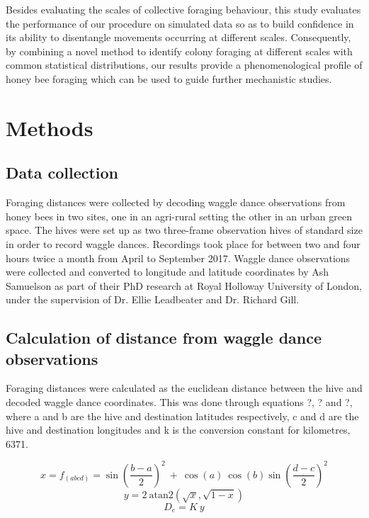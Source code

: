 \documentclass[11pt,usenames,dvipsnames,a4paper]{article}
\begin{document}
\begin{linenumbers}
Besides evaluating the scales of collective foraging behaviour, this study evaluates the performance of our procedure on simulated data so as to build confidence in its ability to disentangle movements occurring at different scales. Consequently, by combining a novel method to identify colony foraging at different scales with common statistical distributions, our results provide a phenomenological profile of honey bee foraging which can be used to guide further mechanistic studies.
\end{linenumbers}
	
\section{Methods}

\subsection{Data collection}

\begin{linenumbers}
\hspace{\parindent}
Foraging distances were collected by decoding waggle dance observations from honey bees in two sites, one in an agri-rural setting the other in an urban green space. The hives were set up as two three-frame observation hives of standard size in order to record waggle dances. Recordings took place for between two and four hours twice a month from April to September 2017. Waggle dance observations were collected and converted to longitude and latitude coordinates by Ash Samuelson as part of their PhD research at Royal Holloway University of London, under the supervision of Dr. Ellie Leadbeater and Dr. Richard Gill.
\end{linenumbers}

\subsection{Calculation of distance from waggle dance observations}

\begin{linenumbers}
\hspace{\parindent}
Foraging distances were calculated as the euclidean distance between the hive and decoded waggle dance coordinates. This was done through equations ?, ? and ?, where a and b are the hive and destination latitudes respectively, c and d are the hive and destination longitudes and k is the conversion constant for kilometres, 6371.
\end{linenumbers}
\begin{equation}
x = f_{(abcd)} = \sin\left(\frac{b - a}{2}\right)^2\ +\ \cos(a)\ \cos(b) \sin\left(\frac{d - c}{2}\right)^2 
\end{equation}
\begin{equation}
y = 2\ \text{atan2}(\sqrt{x}, \sqrt{1 - x})
\end{equation}
\begin{equation}
D_e = K\ y
\end{equation}
\end{document}
